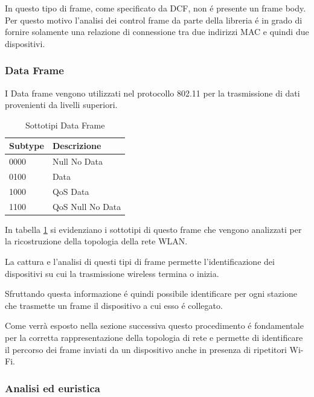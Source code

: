 In questo tipo di frame, come specificato da DCF, non \'e presente un frame body.
Per questo motivo l'analisi dei control frame da parte della libreria \'e in grado di fornire solamente una relazione di connessione tra due indirizzi MAC e quindi due dispositivi.

\subsubsection{Data Frame}

I Data frame vengono utilizzati nel protocollo 802.11 per la trasmissione di dati provenienti da livelli superiori.

\begin{table}
\centering
\begin{tabular}{| l | l |}
	\hline
	Subtype  & Descrizione \\ \hline
	0000	 & Null No Data 	\\ \hline
	0100	 & Data \\ \hline
	1000 &	QoS Data \\ \hline
	1100	& QoS Null No Data \\ \hline
\end{tabular}
\centering
\caption{Sottotipi Data Frame}
\label{table:dataframes}
\end{table}

In tabella \ref{table:dataframes} si evidenziano i sottotipi di questo frame che vengono analizzati per la ricostruzione della topologia della rete WLAN.

La cattura e l'analisi di questi tipi di frame permette l'identificazione dei dispositivi su cui la trasmissione wireless termina o inizia.

Sfruttando questa informazione \'e quindi possibile identificare per ogni stazione che trasmette un frame il dispositivo a cui esso \'e collegato.

Come verr\`a esposto nella sezione successiva questo procedimento \'e fondamentale per la corretta rappresentazione della topologia di rete e permette di identificare il percorso dei frame inviati da un dispositivo anche in presenza di ripetitori Wi-Fi.

\subsubsection{Analisi ed euristica}

